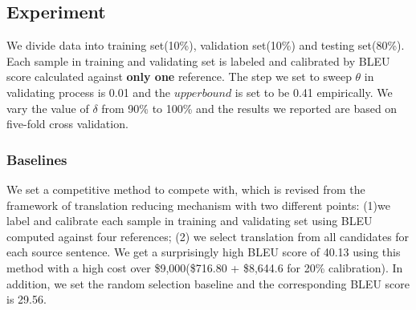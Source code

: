 \documentclass[11pt,letterpaper]{article}
\begin{document}
\subsection{Experiment}
 We divide data into training set(10\%), validation set(10\%) and testing set(80\%). Each sample in training and validating set is labeled and calibrated by BLEU score calculated against \textbf{only one} reference. The step we set to sweep $\theta$ in validating process is 0.01 and the $upperbound$ is set to be 0.41 empirically. We vary the value of $\delta$ from 90\% to 100\% and the results we reported are based on five-fold cross validation.

\subsubsection{Baselines} We set a competitive method to compete with, which is revised from the framework of translation reducing mechanism with two different points: (1)we label and calibrate each sample in training and validating set using BLEU computed against four references; (2) we select translation from all candidates for each source sentence. We get a surprisingly high BLEU score of 40.13 using this method with a high cost over \$9,000(\$716.80 + \$8,644.6 for 20\% calibration). In addition, we set the random selection baseline and the corresponding BLEU score is 29.56.
\end{document}
